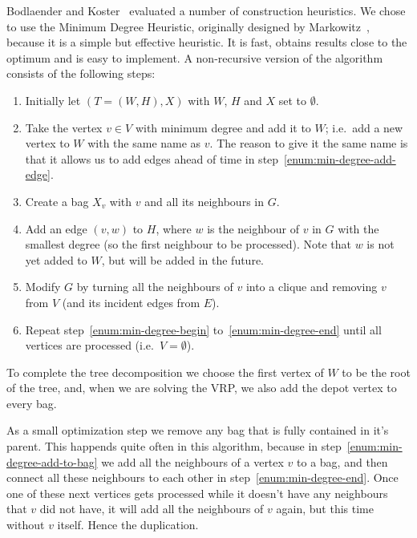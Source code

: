 \documentclass[12pt]{article}
\begin{document}
    Bodlaender and Koster~\cite{tw-upper-bounds} evaluated a number of construction heuristics. We
    chose to use the Minimum Degree Heuristic, originally designed by Markowitz~\cite{min-degree},
    because it is a simple but effective heuristic. It is fast, obtains results close to the optimum
    and is easy to implement.
    A non-recursive version of the algorithm consists of the following steps:
    \begin{enumerate}
        \itemsep 0em
        \item
            Initially let $(T=(W, H), X)$ with $W$, $H$ and $X$ set to $\emptyset$.
        \item
        \label{enum:min-degree-begin}
            Take the vertex $v \in V$ with minimum degree and add it to $W$; i.e.\ add a new
            vertex to $W$ with the same name as $v$.
            The reason to give it the same name is that it allows us to add edges ahead of time in
            step~\ref{enum:min-degree-add-edge}.
        \item
        \label{enum:min-degree-add-to-bag}
            Create a bag $X_v$ with $v$ and all its neighbours in $G$.
        \item
        \label{enum:min-degree-add-edge}
            Add an edge $(v, w)$ to $H$, where $w$ is the neighbour of $v$ in $G$ with the smallest
            degree (so the first neighbour to be processed). Note that $w$ is not yet added to $W$,
            but will be added in the future.
        \item
        \label{enum:min-degree-end}
            Modify $G$ by turning all the neighbours of $v$ into a clique and removing $v$ from
            $V$ (and its incident edges from $E$).
        \item
            Repeat step~\ref{enum:min-degree-begin} to~\ref{enum:min-degree-end} until all vertices
            are processed (i.e.\ $V = \emptyset$).
    \end{enumerate}
    To complete the tree decomposition we choose the first vertex of $W$ to be the root of the tree,
    and, when we are solving the VRP, we also add the depot vertex to every bag.

    As a small optimization step we remove any bag that is fully contained in it's parent. This
    happends quite often in this algorithm, because in step~\ref{enum:min-degree-add-to-bag} we add
    all the neighbours of a vertex $v$ to a bag, and then connect all these neighbours to each other
    in step~\ref{enum:min-degree-end}. Once one of these next vertices gets processed while it
    doesn't have any neighbours that $v$ did not have, it will add all the neighbours of $v$ again,
    but this time without $v$ itself. Hence the duplication.
\end{document}
